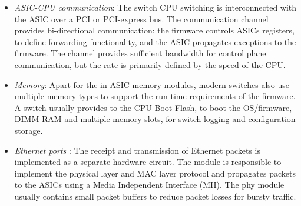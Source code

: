 \begin{itemize}
        TOR-type switches can handle line-rate non-blocking traffic for a few
        ports, using a single ASIC silicon.  An ASIC contains four important
        modules.  The \emph{input arbiter} module multiplexes and synchronizes
        packets from the Ethernet ports to the main processing pipeline of the
        silicon. The arbiter ensures non-preemptive packet processing, by
        bridging the rate mismatch between the silicon clock and the
        transmission rate of the link.  In the main processing pipeline the ASIC
        requires a \emph{protocol parsing} module and an \emph{address lookup}
        module. The protocol parser extracts significant packet fields from a
        packet and the memory lookup module uses them to define the packet
        processing and forwarding operations.  The lookup module relies on an
        interface with an external memory module in order to match protocol
        fields with forwarding policy.  Memory modules have a trade-off between
        cost and access speed and there is a trade-off between memory cost and
        memory management complexity~\footnote{CAM/TCAM lookup: < 10 clock
          cycles, SRAM: 2-3 nsec, DRAM: 20-35
          nsec,~\url{http://people.ee.duke.edu/~sorin/prior-courses/ece152-spring2009/lectures/6.2.2-memory.pdf}}.
        Finally, the \emph{output arbiter} module is responsible to perform the
        required modifications to the packet and forward it to the appropriate
        output queue. Apart for the mentioned modules, a silicon can have
        additional processing modules to enable extended functionality such as
        access control list (ACL), flow statistics monitoring.

  \item \emph{ASIC-CPU communication}: The switch CPU switching is
        interconnected with the ASIC over a PCI or PCI-express bus. The
        communication channel provides bi-directional communication:
        the firmware controls ASICs registers,
        to define forwarding functionality, and the ASIC propagates exceptions
        to the firmware. The channel provides sufficient bandwidth for
        control plane communication, but the rate is primarily defined by the
        speed of the CPU.
  \item \emph{Memory}: Apart for the in-ASIC memory modules, modern switches
        also use multiple memory types to support the run-time requirements of
        the firmware. A switch usually provides to the CPU Boot Flash,
        to boot the OS/firmware, DIMM RAM and multiple memory slots,
        for switch logging and configuration storage.
  \item \emph{Ethernet ports} : The receipt and transmission of Ethernet packets
        is implemented as a separate hardware circuit. The module is responsible
        to implement the physical layer and MAC layer protocol and propagates
        packets to the ASICs using a  Media Independent Interface (MII).  The
        phy module  usually contains small packet buffers to reduce packet
        losses for bursty traffic.  
\end{itemize}

